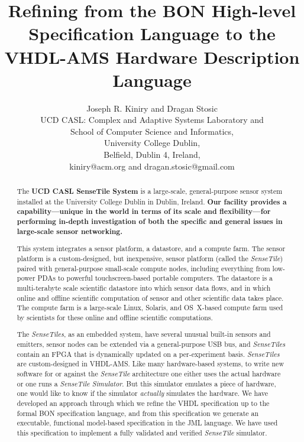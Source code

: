 \documentclass{article}
\newcommand{\ST}{\emph{SenseTile}\xspace}
\newcommand{\STs}{\emph{SenseTiles}\xspace}
\newcommand{\STS}{\emph{SenseTile Simulator}\xspace}
\begin{document}
\title{Refining from the BON High-level Specification Language to the
  VHDL-AMS Hardware Description Language}

\author{Joseph R. Kiniry and Dragan Stosic\\
UCD CASL: Complex and Adaptive Systems Laboratory and\\
School of Computer Science and Informatics,\\
University College Dublin,\\
Belfield, Dublin 4, Ireland,\\
kiniry@acm.org and dragan.stosic@gmail.com\\
}

\maketitle

\begin{abstract}

The \textbf{UCD CASL SenseTile System} is a large-scale, general-purpose
sensor system installed at the University College Dublin in Dublin,
Ireland.  \textbf{Our facility provides a capability---unique in the world in
terms of its scale and flexibility---for performing in-depth
investigation of both the specific and general issues in large-scale
sensor networking.}

This system integrates a sensor platform, a datastore, and a compute
farm.  The sensor platform is a custom-designed, but inexpensive,
sensor platform (called the \ST) paired with general-purpose
small-scale compute nodes, including everything from low-power PDAs to
powerful touchscreen-based portable computers.  The datastore is a
multi-terabyte scale scientific datastore into which sensor data
flows, and in which online and offline scientific computation of
sensor and other scientific data takes place.  The compute farm is a
large-scale Linux, Solaris, and OS~X-based compute farm used by
scientists for these online and offline scientific computations.

The \STs, as an embedded system, have several unusual built-in sensors
and emitters, sensor nodes can be extended via a general-purpose USB bus,
and \STs contain an FPGA that is dynamically updated on a per-experiment
basis.  \STs are custom-designed in VHDL-AMS.  Like many hardware-based systems,
 to write new software for or against the \ST architecture one either uses
the actual hardware or one runs a \STS.  But this simulator emulates a
piece of hardware, one would like to know if the simulator
\emph{actually} simulates the hardware.  We have developed an approach
through which we refine the VHDL specification up to the formal BON
specification language, and from this specification we generate an
executable, functional model-based specification in the JML language.
We have used this specification to implement a fully validated and
verified \ST simulator.

\end{abstract}
\end{document}
